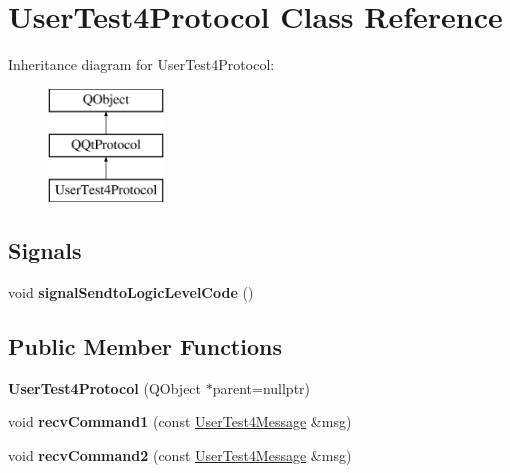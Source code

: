 \hypertarget{class_user_test4_protocol}{}\section{User\+Test4\+Protocol Class Reference}
\label{class_user_test4_protocol}
Inheritance diagram for User\+Test4\+Protocol\+:\begin{figure}[H]
\begin{center}
\leavevmode
\includegraphics[height=3.000000cm]{class_user_test4_protocol}
\end{center}
\end{figure}
\subsection*{Signals}
\begin{DoxyCompactItemize}
\item 
\mbox{\label{class_user_test4_protocol_a9d5bf2e09f252f7dd08ab14e23ddf2ea}} 
void {\bfseries signal\+Sendto\+Logic\+Level\+Code} ()
\end{DoxyCompactItemize}
\subsection*{Public Member Functions}
\begin{DoxyCompactItemize}
\item 
\mbox{\label{class_user_test4_protocol_aacaf1cbe98b7d8edc6b55f5d13900715}} 
{\bfseries User\+Test4\+Protocol} (Q\+Object $\ast$parent=nullptr)
\item 
\mbox{\label{class_user_test4_protocol_a1d18cf35e1244ea722bb35263ab209a7}} 
void {\bfseries recv\+Command1} (const \mbox{\hyperlink{class_user_test4_message}{User\+Test4\+Message}} \&msg)
\item 
\mbox{\label{class_user_test4_protocol_ae7f359b2de05e4e44b861a2224deb22b}} 
void {\bfseries recv\+Command2} (const \mbox{\hyperlink{class_user_test4_message}{User\+Test4\+Message}} \&msg)
\end{DoxyCompactItemize}
